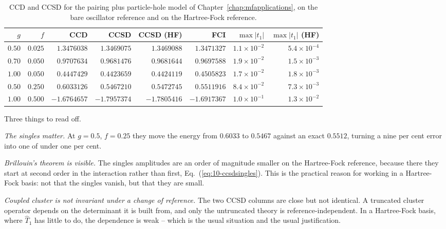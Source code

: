 \begin{table}[h]
\centering
\renewcommand{\arraystretch}{1.25}
\setlength{\tabcolsep}{5pt}
\small
\begin{tabular}{rrrrrrrr}
\toprule
$g$ & $f$ & CCD & CCSD & CCSD (HF) & FCI
  & $\max|t_1|$ & $\max|t_1|$ (HF)\\
\midrule
$0.50$ & $0.025$ & $1.3476038$ & $1.3469075$ & $1.3469088$ & $1.3471327$
  & $1.1\times10^{-2}$ & $5.4\times10^{-4}$\\
$0.70$ & $0.050$ & $0.9707634$ & $0.9681476$ & $0.9681644$ & $0.9697588$
  & $1.9\times10^{-2}$ & $1.5\times10^{-3}$\\
$1.00$ & $0.050$ & $0.4447429$ & $0.4423659$ & $0.4424119$ & $0.4505823$
  & $1.7\times10^{-2}$ & $1.8\times10^{-3}$\\
$0.50$ & $0.250$ & $0.6033126$ & $0.5467210$ & $0.5472745$ & $0.5511916$
  & $8.4\times10^{-2}$ & $7.3\times10^{-3}$\\
$1.00$ & $0.500$ & $-1.6764657$ & $-1.7957374$ & $-1.7805416$ & $-1.6917367$
  & $1.0\times10^{-1}$ & $1.3\times10^{-2}$\\
\bottomrule
\end{tabular}
\caption{CCD and CCSD for the pairing plus particle-hole model of
Chapter~\ref{chap:mfapplications}, on the bare oscillator reference and on
the Hartree-Fock reference.}
\label{tab:ccsdph}
\end{table}

Three things to read off.

\emph{The singles matter.}  At $g=0.5$, $f=0.25$ they move the energy from
$0.6033$ to $0.5467$ against an exact $0.5512$, turning a nine per cent error
into one of under one per cent.

\emph{Brillouin's theorem is visible.}  The singles amplitudes are an order of
magnitude smaller on the Hartree-Fock reference, because there they start at
second order in the interaction rather than first,
Eq.~(\ref{eq:10-ccsdsingles}).  This is the practical reason for working in a
Hartree-Fock basis: not that the singles vanish, but that they are small.

\emph{Coupled cluster is not invariant under a change of reference.}  The two
CCSD columns are close but not identical.  A truncated cluster operator
depends on the determinant it is built from, and only the untruncated theory
is reference-independent.  In a Hartree-Fock basis, where $\hat{T}_1$ has
little to do, the dependence is weak -- which is the usual situation and the
usual justification.


